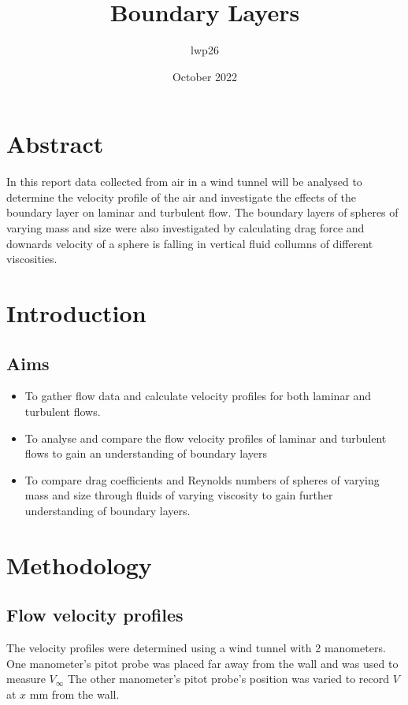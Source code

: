 \documentclass{article}
\begin{document}
\title{Boundary Layers}
\author{lwp26 }
\date{October 2022}
\maketitle

\section{Abstract}
In this report data collected from air in a wind tunnel will be analysed to determine the
velocity profile of the air and investigate the effects of the boundary layer on laminar and turbulent flow.
The boundary layers of spheres of varying mass and size were also investigated by calculating drag force and downards velocity
of a sphere is falling in vertical fluid collumns of different viscosities.

\section{Introduction}


\subsection{Aims}

\begin{itemize}
\item To gather flow data and calculate velocity profiles for both laminar and turbulent flows.
\item To analyse and compare the flow velocity profiles of laminar and turbulent flows to gain an understanding of boundary layers
\item To compare drag coefficients and Reynolds numbers of spheres of varying mass and size through fluids of varying viscosity to gain further understanding of boundary layers.
\end{itemize}

\section{Methodology}

\subsection{Flow velocity profiles}
The velocity profiles were determined using a wind tunnel with 2 manometers. One manometer's pitot probe was placed far away from the wall and was used to measure $V_\infty$ The other manometer's pitot probe's position was varied to record $V$ at $x$ mm from the wall.
\end{document}
